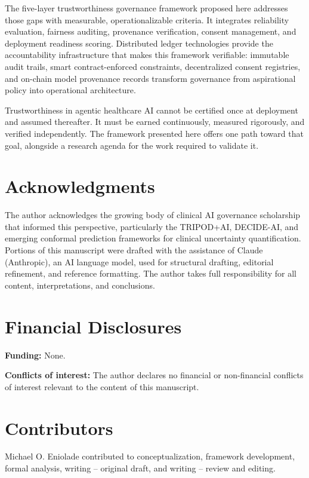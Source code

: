 \documentclass[11pt]{article}
\begin{document}
The five-layer trustworthiness governance framework proposed here
addresses those gaps with measurable, operationalizable criteria. It
integrates reliability evaluation, fairness auditing, provenance
verification, consent management, and deployment readiness scoring.
Distributed ledger technologies provide the accountability
infrastructure that makes this framework verifiable: immutable audit
trails, smart contract-enforced constraints, decentralized consent
registries, and on-chain model provenance records transform governance
from aspirational policy into operational architecture.

Trustworthiness in agentic healthcare AI cannot be certified once at
deployment and assumed thereafter. It must be earned continuously,
measured rigorously, and verified independently. The framework presented
here offers one path toward that goal, alongside a research agenda for
the work required to validate it.


\section*{Acknowledgments}\label{acknowledgments}

The author acknowledges the growing body of clinical AI governance
scholarship that informed this perspective, particularly the TRIPOD+AI,
DECIDE-AI, and emerging conformal prediction frameworks for clinical
uncertainty quantification. Portions of this manuscript were drafted
with the assistance of Claude (Anthropic), an AI language model, used
for structural drafting, editorial refinement, and reference formatting.
The author takes full responsibility for all content, interpretations,
and conclusions.


\section*{Financial Disclosures}\label{financial-disclosures}

\textbf{Funding:} None.

\textbf{Conflicts of interest:} The author declares no financial or
non-financial conflicts of interest relevant to the content of this
manuscript.


\section*{Contributors}\label{contributors}

Michael O. Eniolade contributed to conceptualization, framework
development, formal analysis, writing -- original draft, and writing --
review and editing.
\end{document}
